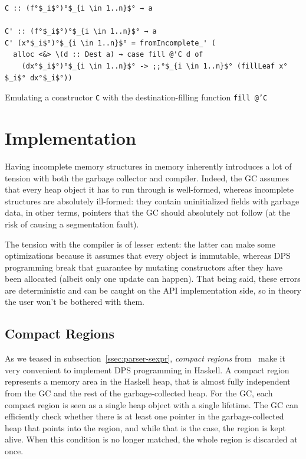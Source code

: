 \documentclass[english]{jflart}
\begin{document}
\begin{table}[t]
\small
\begin{verbatim}
C :: (f°$_i$°)°$_{i \in 1..n}$° → a

C' :: (f°$_i$°)°$_{i \in 1..n}$° → a
C' (x°$_i$°)°$_{i \in 1..n}$° = fromIncomplete_' (
  alloc <&> \(d :: Dest a) → case fill @'C d of
    (dx°$_i$°)°$_{i \in 1..n}$° -> ;;°$_{i \in 1..n}$° (fillLeaf x°$_i$° dx°$_i$°))
\end{verbatim}
\caption{Emulating a constructor \texttt{C} with the destination-filling function \texttt{fill @'C}}
\label{table:emulate-ctor}
\end{table}

\section{Implementation}\label{sec:implementation}

Having incomplete memory structures in memory inherently introduces a lot of tension with both the garbage collector and compiler. Indeed, the GC assumes that every heap object it has to run through is well-formed, whereas incomplete structures are absolutely ill-formed: they contain uninitialized fields with garbage data, in other terms, pointers that the GC should absolutely not follow (at the risk of causing a segmentation fault).

The tension with the compiler is of lesser extent: the latter can make some optimizations because it assumes that every object is immutable, whereas DPS programming break that guarantee by mutating constructors after they have been allocated (albeit only one update can happen). That being said, these errors are deterministic and can be caught on the API implementation side, so in theory the user won't be bothered with them.

\subsection{Compact Regions}\label{ssec:impl-compact-regions}

As we teased in subsection~\ref{ssec:parser-sexpr}, \emph{compact regions} from~\cite{yang_efficient_2015} make it very convenient to implement DPS programming in 
Haskell. A compact region represents a memory area in the Haskell heap, that is almost fully independent from the GC and the rest of the garbage-collected heap. For the GC, each compact region is seen as a single heap object with a single lifetime. The GC can efficiently check whether there is at least one pointer in the garbage-collected heap that points into the region, and while that is the case, the region is kept alive. When this condition is no longer matched, the whole region is discarded at once.
\end{document}
